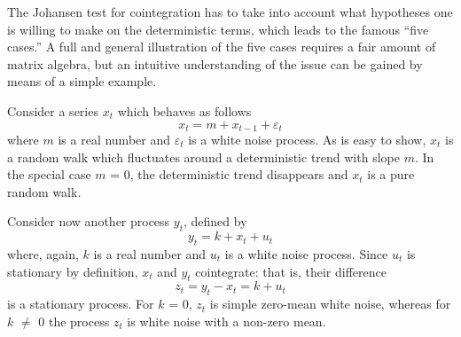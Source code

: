 The Johansen test for cointegration has to take into account what
hypotheses one is willing to make on the deterministic terms, which
leads to the famous ``five cases.'' A full and general illustration of
the five cases requires a fair amount of matrix algebra, but an
intuitive understanding of the issue can be gained by means of a
simple example.
    
Consider a series $x_t$ which behaves as follows
%      
\[ x_t = m + x_{t-1} + \varepsilon_t \] 
%
where $m$ is a real number and $\varepsilon_t$ is a white noise
process. As is easy to show, $x_t$ is a random walk which fluctuates
around a deterministic trend with slope $m$. In the special case $m$ =
0, the deterministic trend disappears and $x_t$ is a pure random walk.
    
Consider now another process $y_t$, defined by
%      
\[ y_t = k + x_t + u_t \] 
%
where, again, $k$ is a real number and $u_t$ is a white noise process.
Since $u_t$ is stationary by definition, $x_t$ and $y_t$ cointegrate:
that is, their difference
%      
\[ z_t = y_t - x_t = k + u_t \]
%	
is a stationary process. For $k$ = 0, $z_t$ is simple zero-mean white
noise, whereas for $k$ $\ne$ 0 the process $z_t$ is white noise with a
non-zero mean.
  
